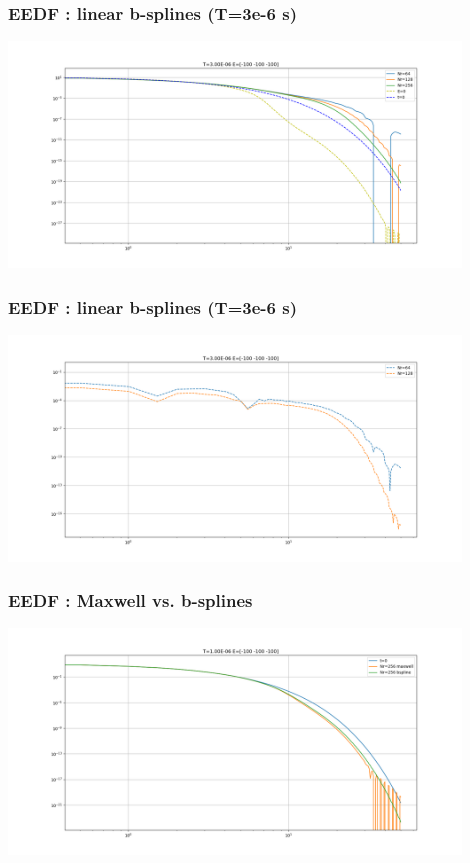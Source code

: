 \documentclass[mathserif, aspectratio=169]{beamer}
\begin{document}
\begin{frame}
	\frametitle{EEDF : linear b-splines (T=3e-6 s)}
	\begin{center}
		\includegraphics[width=0.9\textwidth]{figures/g0_3_bspline_eedf.png}
	\end{center}
\end{frame}

\begin{frame}
	\frametitle{EEDF : linear b-splines (T=3e-6 s)}
	\begin{center}
		\includegraphics[width=0.9\textwidth]{figures/g0_3_bspline_eedf_conv.png}
	\end{center}
\end{frame}


\begin{frame}
	\frametitle{EEDF : Maxwell vs. b-splines}
	\begin{center}
		\includegraphics[width=0.9\textwidth]{figures/g0_1_bspline_vs_maxwell.png}
	\end{center}
\end{frame}
\end{document}
